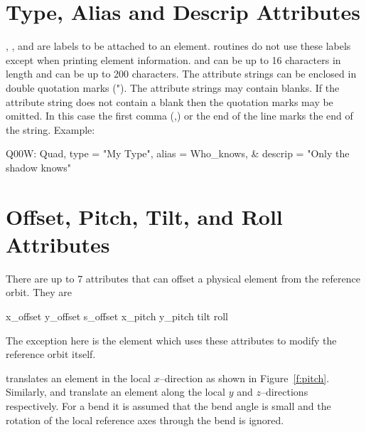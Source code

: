 \section{Type, Alias and Descrip Attributes}
\label{s:string}

, , and  are labels to be attached 
to an element. \bmad routines do not use these labels except 
when printing element information. 
and  can be up to 16 characters in length and 
can be up to 200 characters. The attribute strings can be enclosed in
double quotation marks ("). The attribute strings may contain
blanks. If the attribute string does not contain a blank then the
quotation marks may be omitted. In this case the first comma (,) or
the end of the line marks the end of the string. Example:
\begin{example}
  Q00W: Quad, type = "My Type", alias = Who_knows, &
                                  descrip = "Only the shadow knows"
\end{example}

\section{Offset, Pitch, Tilt, and Roll Attributes}
\label{s:offset}

There are up to 7 attributes that can offset a physical element
from the reference orbit. They are
\begin{example}
  x_offset
  y_offset
  s_offset
  x_pitch
  y_pitch
  tilt
  roll
\end{example}
The exception here is the  element which uses these
attributes to modify the reference orbit itself.

 translates an element in the local $x$--direction
as shown in Figure~\ref{f:pitch}. Similarly,  and 
 translate an element along the local $y$ and 
$z$--directions respectively. For a bend it is assumed that
the bend angle is small and the rotation of the local reference
axes through the bend is ignored.

